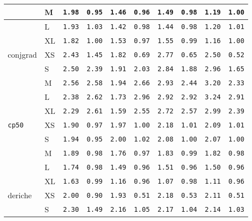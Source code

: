 \begin{tabular}{l | l | l | l | l | l | l | l | l | l}
             & M    & \verb|1.98| & \verb|0.95| & \verb|1.46| & \verb|0.96| & \verb|1.49| & \verb|0.98| & \verb|1.19| & \verb|1.00| \\ \hline
             & L    & \verb|1.93| & \verb|1.03| & \verb|1.42| & \verb|0.98| & \verb|1.44| & \verb|0.98| & \verb|1.20| & \verb|1.01| \\ \hline
             & XL   & \verb|1.82| & \verb|1.00| & \verb|1.53| & \verb|0.97| & \verb|1.55| & \verb|0.99| & \verb|1.16| & \verb|1.00| \\ \hline
    conjgrad & XS   & \verb|2.43| & \verb|1.45| & \verb|1.82| & \verb|0.69| & \verb|2.77| & \verb|0.65| & \verb|2.50| & \verb|0.52| \\ \hline
             & S    & \verb|2.50| & \verb|2.39| & \verb|1.91| & \verb|2.03| & \verb|2.84| & \verb|1.88| & \verb|2.96| & \verb|1.65| \\ \hline
             & M    & \verb|2.56| & \verb|2.58| & \verb|1.94| & \verb|2.66| & \verb|2.93| & \verb|2.44| & \verb|3.20| & \verb|2.33| \\ \hline
             & L    & \verb|2.38| & \verb|2.62| & \verb|1.73| & \verb|2.96| & \verb|2.92| & \verb|2.92| & \verb|3.24| & \verb|2.91| \\ \hline
             & XL   & \verb|2.29| & \verb|2.61| & \verb|1.59| & \verb|2.55| & \verb|2.72| & \verb|2.57| & \verb|2.99| & \verb|2.39| \\ \hline
    \verb|cp50    | & XS   & \verb|1.90| & \verb|0.97| & \verb|1.97| & \verb|1.00| & \verb|2.18| & \verb|1.01| & \verb|2.09| & \verb|1.01| \\ \hline
             & S    & \verb|1.94| & \verb|0.95| & \verb|2.00| & \verb|1.02| & \verb|2.08| & \verb|1.00| & \verb|2.07| & \verb|1.00| \\ \hline
             & M    & \verb|1.89| & \verb|0.98| & \verb|1.76| & \verb|0.97| & \verb|1.83| & \verb|0.99| & \verb|1.82| & \verb|0.98| \\ \hline
             & L    & \verb|1.74| & \verb|0.98| & \verb|1.49| & \verb|0.96| & \verb|1.51| & \verb|0.96| & \verb|1.50| & \verb|0.96| \\ \hline
             & XL   & \verb|1.63| & \verb|0.99| & \verb|1.16| & \verb|0.96| & \verb|1.07| & \verb|0.98| & \verb|1.11| & \verb|0.96| \\ \hline
    deriche  & XS   & \verb|2.00| & \verb|0.90| & \verb|1.93| & \verb|0.51| & \verb|2.18| & \verb|0.53| & \verb|2.11| & \verb|0.51| \\ \hline
             & S    & \verb|2.30| & \verb|1.49| & \verb|2.16| & \verb|1.05| & \verb|2.17| & \verb|1.04| & \verb|2.14| & \verb|1.03| \\ \hline

\end{tabular}
